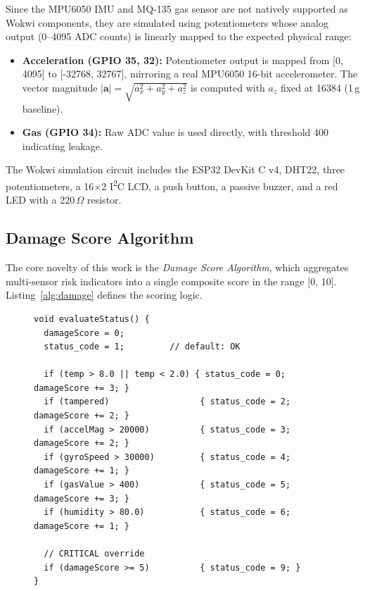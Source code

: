 \documentclass[12pt, a4paper]{article}
\begin{document}
Since the MPU6050 IMU and MQ-135 gas sensor are not natively supported as Wokwi components, they are simulated using potentiometers whose analog output (0--4095 ADC counts) is linearly mapped to the expected physical range:

\begin{itemize}
  \item \textbf{Acceleration (GPIO 35, 32):} Potentiometer output is mapped from [0, 4095] to [-32768, 32767], mirroring a real MPU6050 16-bit accelerometer. The vector magnitude $|\mathbf{a}| = \sqrt{a_x^2 + a_y^2 + a_z^2}$ is computed with $a_z$ fixed at 16384 (1\,g baseline).
  \item \textbf{Gas (GPIO 34):} Raw ADC value is used directly, with threshold 400 indicating leakage.
\end{itemize}

The Wokwi simulation circuit includes the ESP32 DevKit C v4, DHT22, three potentiometers, a 16$\times$2 I\textsuperscript{2}C LCD, a push button, a passive buzzer, and a red LED with a 220\,$\Omega$ resistor.


\subsection{Damage Score Algorithm}

The core novelty of this work is the \textit{Damage Score Algorithm}, which aggregates multi-sensor risk indicators into a single composite score in the range [0, 10]. Listing~\ref{alg:damage} defines the scoring logic.

\begin{figure}[H]
\centering
\begin{minipage}{0.88\linewidth}
\begin{lstlisting}[style=cppstyle, caption={Damage Score Algorithm (C++ / Arduino)}, label={alg:damage}]
void evaluateStatus() {
  damageScore = 0;
  status_code = 1;         // default: OK

  if (temp > 8.0 || temp < 2.0) { status_code = 0; damageScore += 3; }
  if (tampered)                  { status_code = 2; damageScore += 2; }
  if (accelMag > 20000)          { status_code = 3; damageScore += 2; }
  if (gyroSpeed > 30000)         { status_code = 4; damageScore += 1; }
  if (gasValue > 400)            { status_code = 5; damageScore += 3; }
  if (humidity > 80.0)           { status_code = 6; damageScore += 1; }

  // CRITICAL override
  if (damageScore >= 5)          { status_code = 9; }
}
\end{lstlisting}
\end{minipage}
\end{figure}
\end{document}

